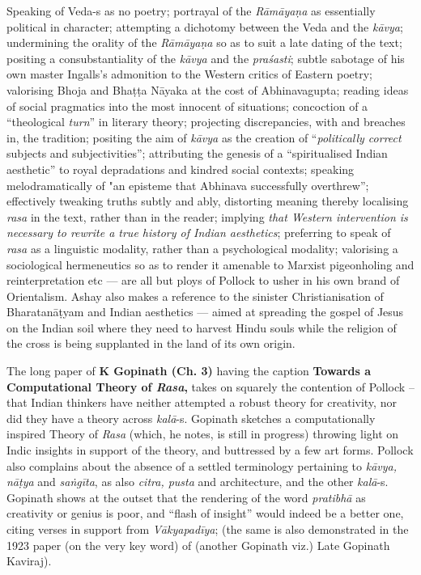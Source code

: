 Speaking of Veda-s as no poetry; portrayal of the \textsl{Rāmāyaṇa} as essentially political in character; attempting a dichotomy between the Veda and the \textsl{kāvya}; undermining the orality of the \textsl{Rāmāyaṇa} so as to suit a late dating of the text; positing a consubstantiality of the \textsl{kāvya} and the \textsl{praśasti}; subtle sabotage of his own master Ingalls's admonition to the Western critics of Eastern poetry; valorising Bhoja and Bhaṭṭa Nāyaka at the cost of Abhinavagupta; reading ideas of social pragmatics into the most innocent of situations; concoction of a “theological \textsl{turn}” in literary theory; projecting discrepancies, with and breaches in, the tradition; positing the aim of \textsl{kāvya} as the creation of “\textsl{politically correct} subjects and subjectivities''; attributing the genesis of a “spiritualised Indian aesthetic” to royal depradations and kindred social contexts; speaking melodramatically of "an episteme that Abhinava successfully overthrew”; effectively tweaking truths subtly and ably, distorting meaning thereby localising \textsl{rasa} in the text, rather than in the reader; implying \textsl{that Western intervention is necessary to rewrite a true history of Indian aesthetics}; preferring to speak of \textsl{rasa} as a linguistic modality, rather than a psychological modality; valorising a sociological hermeneutics so as to render it amenable to Marxist pigeonholing and reinterpretation etc --- are all but ploys of Pollock to usher in his own brand of Orientalism. Ashay also makes a reference to the sinister Christianisation of Bharatanāṭyam and Indian aesthetics --- aimed at spreading the gospel of Jesus on the Indian soil where they need to harvest Hindu souls while the religion of the cross is being supplanted in the land of its own origin.

The long paper of {\bf K Gopinath (Ch. 3)} having the caption {\bf Towards a Computational Theory of {\sl\bfseries Rasa},} takes on squarely the contention of Pollock -- that Indian thinkers have neither attempted a robust theory for creativity, nor did they have a theory across \textsl{kalā}-s. Gopinath sketches a computationally inspired Theory of \textsl{Rasa} (which, he notes, is still in progress) throwing light on Indic insights in support of the theory, and buttressed by a few art forms. Pollock also complains about the absence of a settled terminology pertaining to \textsl{kāvya, nāṭya} and \textsl{saṅgīta}, as also \textsl{citra, pusta} and architecture, and the other \textsl{kalā}-s. Gopinath shows at the outset that the rendering of the word \textsl{pratibhā} as creativity or genius is poor, and “flash of insight” would indeed be a better one, citing verses in support from \textsl{Vākyapadīya}; (the same is also demonstrated in the 1923 paper (on the very key word) of (another Gopinath viz.) Late Gopinath Kaviraj).

